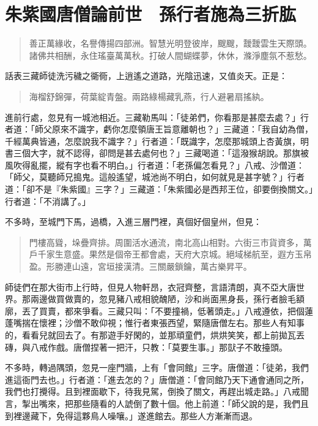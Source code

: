 
\chapter{朱紫國唐僧論前世　孫行者施為三折肱}

\begin{quote}
善正萬緣收，名譽傳揚四部洲。智慧光明登彼岸，颼颼，靉靉雲生天際頭。諸佛共相酬，永住瑤臺萬萬秋。打破人間蝴蝶夢，休休，滌淨塵氛不惹愁。
\end{quote}

話表三藏師徒洗污穢之衚衕，上逍遙之道路，光陰迅速，又值炎天。正是：
\begin{quote}
海榴舒錦彈，荷葉綻青盤。兩路綠楊藏乳燕，行人避暑扇搖紈。
\end{quote}

進前行處，忽見有一城池相近。三藏勒馬叫：「徒弟們，你看那是甚麼去處？」行者道：「師父原來不識字，虧你怎麼領唐王旨意離朝也？」三藏道：「我自幼為僧，千經萬典皆通，怎麼說我不識字？」行者道：「既識字，怎麼那城頭上杏黃旗，明書三個大字，就不認得，卻問是甚去處何也？」三藏喝道：「這潑猴胡說。那旗被風吹得亂擺，縱有字也看不明白。」行者道：「老孫偏怎看見？」八戒、沙僧道：「師父，莫聽師兄搗鬼。這般遙望，城池尚不明白，如何就見是甚字號？」行者道：「卻不是『朱紫國』三字？」三藏道：「朱紫國必是西邦王位，卻要倒換關文。」行者道：「不消講了。」

不多時，至城門下馬，過橋，入進三層門裡，真個好個皇州，但見：
\begin{quote}
門樓高聳，垛疊齊排。周圍活水通流，南北高山相對。六街三市貨資多，萬戶千家生意盛。果然是個帝王都會處，天府大京城。絕域梯航至，遐方玉帛盈。形勝連山遠，宮垣接漢清。三關嚴鎖鑰，萬古樂昇平。
\end{quote}

師徒們在那大街市上行時，但見人物軒昂，衣冠齊整，言語清朗，真不亞大唐世界。那兩邊做買做賣的，忽見豬八戒相貌醜陋，沙和尚面黑身長，孫行者臉毛額廓，丟了買賣，都來爭看。三藏只叫：「不要撞禍，低著頭走。」八戒遵依，把個蓮蓬嘴揣在懷裡；沙僧不敢仰視；惟行者東張西望，緊隨唐僧左右。那些人有知事的，看看兒就回去了。有那遊手好閑的，並那頑童們，烘烘笑笑，都上前拋瓦丟磚，與八戒作戲。唐僧捏著一把汗，只教：「莫要生事。」那獃子不敢擡頭。

不多時，轉過隅頭，忽見一座門牆，上有「會同館」三字。唐僧道：「徒弟，我們進這衙門去也。」行者道：「進去怎的？」唐僧道：「會同館乃天下通會通同之所，我們也打攪得。且到裡面歇下，待我見駕，倒換了關文，再趕出城走路。」八戒聞言，掣出嘴來，把那些隨看的人諕倒了數十個。他上前道：「師父說的是，我們且到裡邊藏下，免得這夥鳥人噪嚷。」遂進館去。那些人方漸漸而退。

